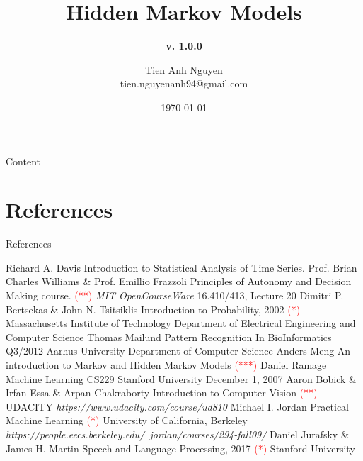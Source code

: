 \documentclass[10pt]{beamer}
\title[] %
{ %
      \textbf{Hidden Markov Models}
}
\subtitle[Hidden Markov Models]
{
      \textbf{v. 1.0.0}
}
\author[Tien Anh Nguyen]
{      Tien Anh Nguyen \\
      {\ttfamily tien.nguyenanh94@gmail.com}
}
\institute[]
{
      Faculty of Electronics and Computer Engineering\\
      Chonnam National University\\
  
}
\date{\today}
\begin{document}

{\1%
\begin{frame}[plain,noframenumbering] %
  \titlepage %
\end{frame}}


\begin{frame}[allowframebreaks]{Content}
\tableofcontents
\end{frame}

\section{References}
\begin{frame}[allowframebreaks]{References}
\begin{thebibliography}{9}
  Richard A. Davis
  \newblock Introduction to Statistical Analysis of Time Series.
  Prof. Brian Charles Williams \& Prof. Emillio Frazzoli
  \newblock Principles of Autonomy and Decision Making course. \textcolor{red}{(**)}
  \newblock \emph{MIT OpenCourseWare} 16.410/413, Lecture 20
  Dimitri P. Bertsekas \& John N. Tsitsiklis
  \newblock Introduction to Probability, 2002 \textcolor{red}{(*)}
  \newblock Massachusetts Institute of Technology
  \newblock Department of Electrical Engineering and Computer Science
  Thomas Mailund
  \newblock Pattern Recognition In BioInformatics Q3/2012
  \newblock Aarhus University
  \newblock Department of Computer Science
  Anders Meng
  \newblock An introduction to Markov and Hidden Markov Models \textcolor{red}{(***)}
  Daniel Ramage
  \newblock Machine Learning CS229
  \newblock Stanford University
  \newblock December 1, 2007
  Aaron Bobick \& Irfan Essa \& Arpan Chakraborty 
  \newblock Introduction to Computer Vision \textcolor{red}{(**)}
  \newblock UDACITY
  \newblock \emph{https://www.udacity.com/course/ud810}
  Michael I. Jordan 
  \newblock Practical Machine Learning \textcolor{red}{(*)}
  \newblock University of California, Berkeley
  \newblock \emph{https://people.eecs.berkeley.edu/~jordan/courses/294-fall09/}
  Daniel Jurafsky \& James H. Martin 
  \newblock Speech and Language Processing, 2017 \textcolor{red}{(*)}
  \newblock Stanford University
\end{thebibliography}
\end{frame}
\end{document}
